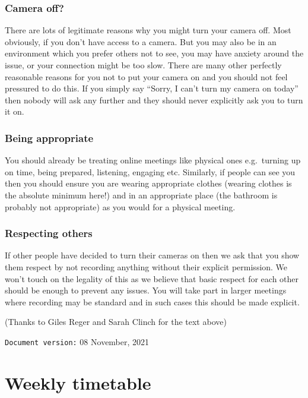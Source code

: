 \documentclass[
]{book}
\begin{document}
\hypertarget{off}{%
\subsection{Camera off?}\label{off}}

There are lots of legitimate reasons why you might turn your camera off. Most obviously, if you don't have access to a camera. But you may also be in an environment which you prefer others not to see, you may have anxiety around the issue, or your connection might be too slow. There are many other perfectly reasonable reasons for you not to put your camera on and you should not feel pressured to do this. If you simply say ``Sorry, I can't turn my camera on today'' then nobody will ask any further and they should never explicitly ask you to turn it on.

\hypertarget{being}{%
\subsection{Being appropriate}\label{being}}

You should already be treating online meetings like physical ones e.g.~turning up on time, being prepared, listening, engaging etc. Similarly, if people can see you then you should ensure you are wearing appropriate clothes (wearing clothes is the absolute minimum here!) and in an appropriate place (the bathroom is probably not appropriate) as you would for a physical meeting.

\hypertarget{respecting}{%
\subsection{Respecting others}\label{respecting}}

If other people have decided to turn their cameras on then we ask that you show them respect by not recording anything without their explicit permission. We won't touch on the legality of this as we believe that basic respect for each other should be enough to prevent any issues. You will take part in larger meetings where recording may be standard and in such cases this should be made explicit.

(Thanks to Giles Reger and Sarah Clinch for the text above)

\texttt{Document\ version:} 08 November, 2021

\hypertarget{timetabling}{%
\chapter*{Weekly timetable}\label{timetabling}}
\end{document}
